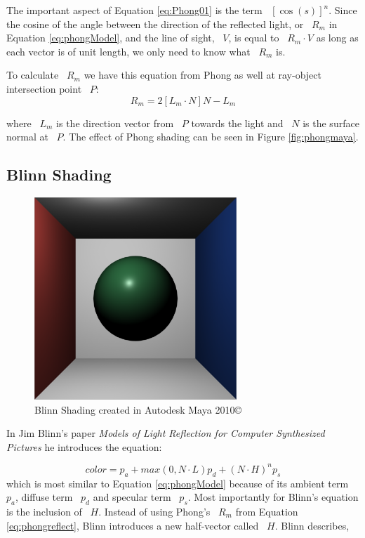 The important aspect of Equation \ref{eq:Phong01} is the term ~$[\cos(s)]^{n}$.  Since the cosine of the angle between the direction of the reflected light, or ~$R_{m}$ in Equation \ref{eq:phongModel}, and the line of sight, ~$V$, is equal to ~$R_{m} \cdot V$ as long as each vector is of unit length, we only need to know what ~$R_{m}$ is.

To calculate ~$R_{m}$ we have this equation from Phong as well\cite{lyon1993phong} at ray-object intersection point ~$P$:
\begin{equation}
\label{eq:phongreflect}
R_m = 2[L_m \cdot N]N - L_m
\end{equation}

where ~$L_{m}$ is the direction vector from ~$P$ towards the light and ~$N$ is the surface normal at ~$P$.  The effect of Phong shading can be seen in Figure \ref{fig:phongmaya}.

\subsection{Blinn Shading}
\label{subsec:Blinn Shading}
\begin{figure}[h]
\centering
\includegraphics[height=3.0in]{figures/blinn_Maya.png}
\caption{Blinn Shading created in Autodesk Maya 2010\copyright}
\label{fig:gooch}
\end{figure}
In Jim Blinn's paper \textit{Models of Light Reflection for Computer Synthesized Pictures} he introduces the equation\cite{Blinn:1977}:

\begin{equation}
\label{eq:blinnModel01}
color = p_{a} + max(0,N\cdot L) p_{d} +  (N \cdot H)^n p_{s}
\end{equation}
which is most similar to Equation \ref{eq:phongModel} because of its ambient term ~$p_{a}$, diffuse term ~$p_{d}$ and specular term ~$p_{s}$.  Most importantly for Blinn's equation is the inclusion of ~$H$.  Instead of using Phong's ~$R_{m}$ from Equation \ref{eq:phongreflect}, Blinn introduces a new half-vector called ~$H$.  Blinn describes,

